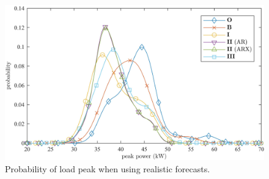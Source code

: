 \begin{figure}[htb]\centering
	\includegraphics[width=\linewidth]{_chapter2/fig/pdf-1-avg}
	\caption{Probability of load peak when using realistic forecasts.}
	\label{ch2:fig:peak-pdf}
\end{figure}